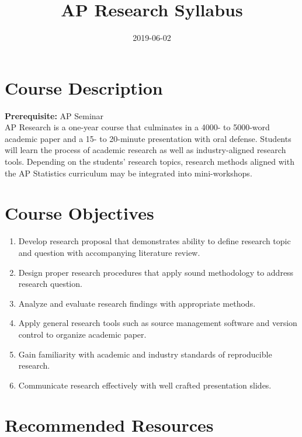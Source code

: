 \documentclass[]{article}
\title{AP Research Syllabus}
\author{}
\date{2019-06-02}
\providecommand{\tightlist}{%
  \setlength{\itemsep}{0pt}\setlength{\parskip}{0pt}}
\begin{document}
\maketitle

{
\setcounter{tocdepth}{2}
\tableofcontents
}
\hypertarget{course-description}{%
\section{Course Description}\label{course-description}}

\textbf{Prerequisite:} AP Seminar\\
AP Research is a one-year course that culminates in a 4000- to 5000-word academic paper and a 15- to 20-minute presentation with oral defense. Students will learn the process of academic research as well as industry-aligned research tools. Depending on the students' research topics, research methods aligned with the AP Statistics curriculum may be integrated into mini-workshops.

\hypertarget{course-objectives}{%
\section{Course Objectives}\label{course-objectives}}

\begin{enumerate}
\def\labelenumi{\arabic{enumi}.}
\tightlist
\item
  Develop research proposal that demonstrates ability to define research topic and question with accompanying literature review.
\item
  Design proper research procedures that apply sound methodology to address research question.
\item
  Analyze and evaluate research findings with appropriate methods.
\item
  Apply general research tools such as source management software and version control to organize academic paper.
\item
  Gain familiarity with academic and industry standards of reproducible research.
\item
  Communicate research effectively with well crafted presentation slides.
\end{enumerate}

\hypertarget{recommended-resources}{%
\section{Recommended Resources}\label{recommended-resources}}
\end{document}
